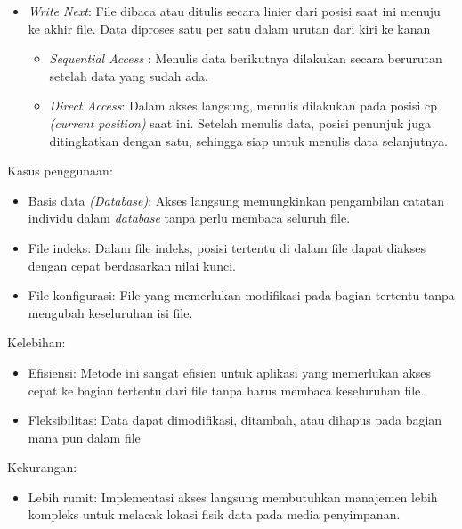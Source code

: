 \documentclass[12pt]{article}
\begin{document}
\begin{enumerate}
\begin{itemize}
\begin{itemize}
        \end{itemize}

        \item \textit{Write Next}: File dibaca atau ditulis secara linier dari posisi saat ini menuju ke akhir file. Data diproses satu per satu dalam urutan dari kiri ke kanan
         \begin{itemize}
        \item \textit{Sequential Access} : Menulis data berikutnya dilakukan secara berurutan setelah data yang sudah ada.

            
        \item \textit{Direct Access}: Dalam akses langsung, menulis dilakukan pada posisi cp \textit{(current position)} saat ini. Setelah menulis data, posisi penunjuk juga ditingkatkan dengan satu, sehingga siap untuk menulis data selanjutnya.
        
        \end{itemize}

    \end{itemize}

    {Kasus penggunaan:}
     \begin{itemize}
        \item Basis data \textit{(Database)}: Akses langsung memungkinkan pengambilan catatan individu dalam  \textit{database} tanpa perlu membaca seluruh file.

        \item File indeks: Dalam file indeks, posisi tertentu di dalam file dapat diakses dengan cepat berdasarkan nilai kunci.

        \item File konfigurasi: File yang memerlukan modifikasi pada bagian tertentu tanpa mengubah keseluruhan isi file.


    \end{itemize}

    {Kelebihan:}
     \begin{itemize}
        \item Efisiensi: Metode ini sangat efisien untuk aplikasi yang memerlukan akses cepat ke bagian tertentu dari file tanpa harus membaca keseluruhan file.

        \item Fleksibilitas: Data dapat dimodifikasi, ditambah, atau dihapus pada bagian mana pun dalam file
    \end{itemize}

    {Kekurangan:}
     \begin{itemize}
        \item Lebih rumit: Implementasi akses langsung membutuhkan manajemen lebih kompleks untuk melacak lokasi fisik data pada media penyimpanan.


\end{itemize}
\end{enumerate}
\end{document}
